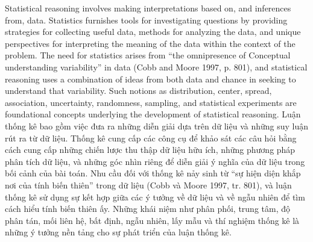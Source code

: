 \documentclass[
  10pt,
  a4paper,
  landscape,
  twoside,
  openany
]{scrbook}
\newcommand{\EN}[1]{#1}
\newcommand{\VI}[1]{#1}
\newcommand{\NOTE}[1]{#1}
\begin{document}
\TriPara
{
\EN{Statistical reasoning involves making interpretations based on, and inferences from, data. Statistics furnishes tools for investigating questions by providing strategies for collecting useful data, methods for analyzing the data, and unique perspectives for interpreting the meaning of the data within the context of the problem. The need for statistics arises from “the omnipresence of Conceptual understanding variability” in data (Cobb and Moore 1997, p. 801), and statistical reasoning uses a combination of ideas from both data and chance in seeking to understand that variability. Such notions as distribution, center, spread, association, uncertainty, randomness, sampling, and statistical experiments are foundational concepts underlying the development of statistical reasoning.}
}
{
\VI{Luận thống kê bao gồm việc đưa ra những diễn giải dựa trên dữ liệu và những suy luận rút ra từ dữ liệu. Thống kê cung cấp các công cụ để khảo sát các câu hỏi bằng cách cung cấp những chiến lược thu thập dữ liệu hữu ích, những phương pháp phân tích dữ liệu, và những góc nhìn riêng để diễn giải ý nghĩa của dữ liệu trong bối cảnh của bài toán. Nhu cầu đối với thống kê nảy sinh từ ``sự hiện diện khắp nơi của tính biến thiên'' trong dữ liệu (Cobb và Moore 1997, tr. 801), và luận thống kê sử dụng sự kết hợp giữa các ý tưởng về dữ liệu và về ngẫu nhiên để tìm cách hiểu tính biến thiên ấy. Những khái niệm như phân phối, trung tâm, độ phân tán, mối liên hệ, bất định, ngẫu nhiên, lấy mẫu và thí nghiệm thống kê là những ý tưởng nền tảng cho sự phát triển của luận thống kê.}
}
{
\NOTE{}
}
\end{document}
